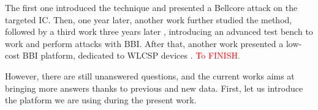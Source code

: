 		The first one \cite{bbiOrigin} introduced the technique and presented a Bellcore attack on the targeted IC.
		Then, one year later, another work \cite{bbiSecond} further studied the method, followed by a third work three years later \cite{bbiThird}, introducing an advanced test bench to work and perform attacks with BBI.
		After that, another work presented a low-cost BBI platform, dedicated to WLCSP devices \cite{bbiColin}.
		\textcolor{red}{To FINISH.}

		However, there are still unanswered questions, and the current works aims at bringing more answers thanks to previous and new data.
		First, let us introduce the platform we are using during the present work.

%
%		
%

